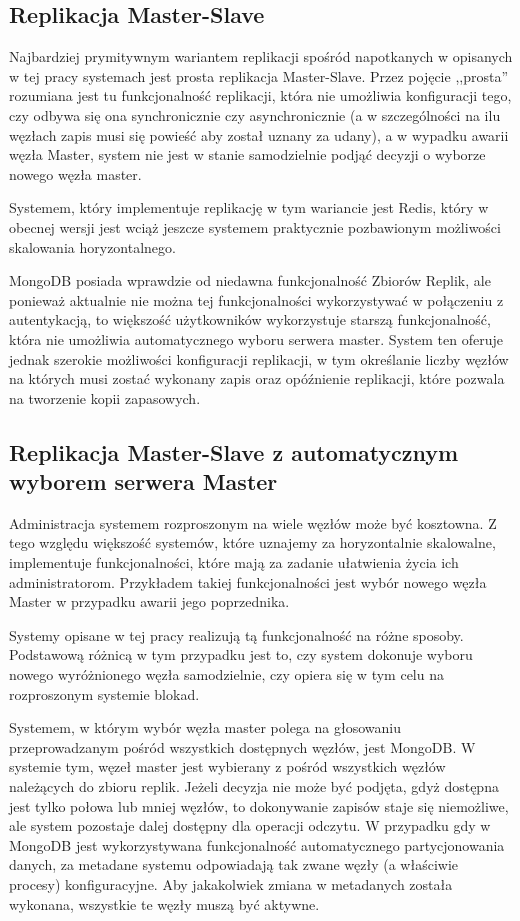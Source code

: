 \subsection*{Replikacja Master-Slave}

Najbardziej prymitywnym wariantem replikacji spośród napotkanych w opisanych w tej pracy systemach jest prosta replikacja Master-Slave.
Przez pojęcie ,,prosta'' rozumiana jest tu funkcjonalność replikacji, która nie umożliwia konfiguracji tego, czy odbywa się ona synchronicznie czy asynchronicznie (a w szczególności na ilu węzłach zapis musi się powieść aby został uznany za udany), a w wypadku awarii węzła Master, system nie jest w stanie samodzielnie podjąć decyzji o wyborze nowego węzła master.

Systemem, który implementuje replikację w tym wariancie jest Redis, który w obecnej wersji jest wciąż jeszcze systemem praktycznie pozbawionym możliwości skalowania horyzontalnego.

MongoDB posiada wprawdzie od niedawna funkcjonalność Zbiorów Replik, ale ponieważ aktualnie nie można tej funkcjonalności wykorzystywać w połączeniu z autentykacją, to większość użytkowników wykorzystuje starszą funkcjonalność, która nie umożliwia automatycznego wyboru serwera master.
System ten oferuje jednak szerokie możliwości konfiguracji replikacji, w tym określanie liczby węzłów na których musi zostać wykonany zapis oraz opóźnienie replikacji, które pozwala na tworzenie kopii zapasowych.

\subsection{Replikacja Master-Slave z automatycznym wyborem serwera Master}

Administracja systemem rozproszonym na wiele węzłów może być kosztowna.
Z tego względu większość systemów, które uznajemy za horyzontalnie skalowalne, implementuje funkcjonalności, które mają za zadanie ułatwienia życia ich administratorom.
Przykładem takiej funkcjonalności jest wybór nowego węzła Master w przypadku awarii jego poprzednika.

Systemy opisane w tej pracy realizują tą funkcjonalność na różne sposoby.
Podstawową różnicą w tym przypadku jest to, czy system dokonuje wyboru nowego wyróżnionego węzła samodzielnie, czy opiera się w tym celu na rozproszonym systemie blokad.

Systemem, w którym wybór węzła master polega na głosowaniu przeprowadzanym pośród wszystkich dostępnych węzłów, jest MongoDB.
W systemie tym, węzeł master jest wybierany z pośród wszystkich węzłów należących do zbioru replik.
Jeżeli decyzja nie może być podjęta, gdyż dostępna jest tylko połowa lub mniej węzłów, to dokonywanie zapisów staje się niemożliwe, ale system pozostaje dalej dostępny dla operacji odczytu.
W przypadku gdy w MongoDB jest wykorzystywana funkcjonalność automatycznego partycjonowania danych, za metadane systemu odpowiadają tak zwane węzły (a właściwie procesy) konfiguracyjne.
Aby jakakolwiek zmiana w metadanych została wykonana, wszystkie te węzły muszą być aktywne.

